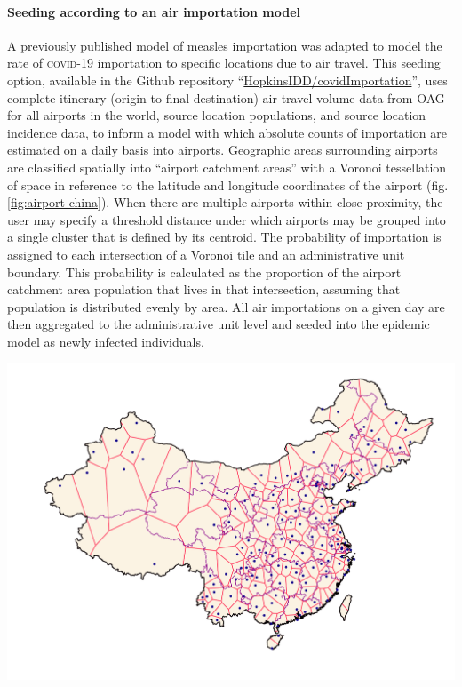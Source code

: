 \paragraph{Seeding according to an air importation model} A previously published model of measles importation was adapted to model the rate of \textsc{covid}-19 importation to specific locations due to air travel\cite{Truelove:EpidemicsAirTravel:2020}. This seeding option, available in the Github repository “\url{HopkinsIDD/covidImportation}”\cite{Truelove:HopkinsIDDCovidImportationInitial:2020}, uses complete itinerary (origin to final destination) air travel volume data from OAG\cite{OAG:FlightDataOAG:2020} for all airports in the world, source location populations, and source location incidence data, to inform a model with which absolute counts of importation are estimated on a daily basis into airports. 
Geographic areas surrounding airports are classified spatially into “airport catchment areas” with a Voronoi tessellation of space in reference to the latitude and longitude coordinates of the airport\cite{Balcan:ModelingSpatialSpread:2010} (fig. \ref{fig:airport-china}). When there are multiple airports within close proximity, the user may specify a threshold distance under which airports may be grouped into a single cluster that is defined by its centroid. The probability of importation is assigned to each intersection of a Voronoi tile and an administrative unit boundary. This probability is calculated as the proportion of the airport catchment area population that lives in that intersection, assuming that population is distributed evenly by area. All air importations on a given day are then aggregated to the administrative unit level and seeded into the epidemic model as newly infected individuals.

 \begin{marginfigure}[-2\baselineskip]
\centering
\includegraphics{fig_pipeline/airport_tessellation.pdf}
\label{fig:airport-china}
\end{marginfigure}

